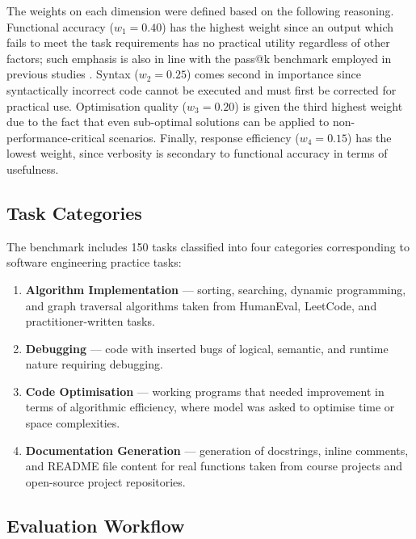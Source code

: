 \documentclass[conference]{IEEEtran}
\begin{document}
The weights on each dimension were defined based on the following reasoning. Functional accuracy ($w_1 = 0.40$) has the highest weight since an output which fails to meet the task requirements has no practical utility regardless of other factors; such emphasis is also in line with the pass@k benchmark employed in previous studies \cite{chen2021codex, liu2023code}. Syntax ($w_2 = 0.25$) comes second in importance since syntactically incorrect code cannot be executed and must first be corrected for practical use. Optimisation quality ($w_3 = 0.20$) is given the third highest weight due to the fact that even sub-optimal solutions can be applied to non-performance-critical scenarios. Finally, response efficiency ($w_4 = 0.15$) has the lowest weight, since verbosity is secondary to functional accuracy in terms of usefulness.

\subsection{Task Categories}

The benchmark includes 150 tasks classified into four categories corresponding to software engineering practice tasks:

\begin{enumerate}
  \item \textbf{Algorithm Implementation} — sorting, searching, dynamic programming, and graph traversal algorithms taken from HumanEval, LeetCode, and practitioner-written tasks.

  \item \textbf{Debugging} — code with inserted bugs of logical, semantic, and runtime nature requiring debugging.

  \item \textbf{Code Optimisation} — working programs that needed improvement in terms of algorithmic efficiency, where model was asked to optimise time or space complexities.

  \item \textbf{Documentation Generation} — generation of docstrings, inline comments, and README file content for real functions taken from course projects and open-source project repositories.
\end{enumerate}

\subsection{Evaluation Workflow}
\end{document}
